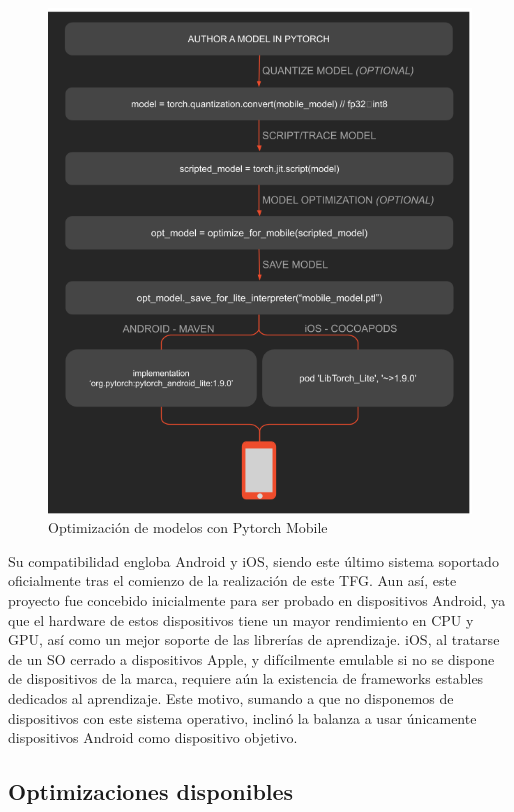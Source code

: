 \begin{figure}[H]
	\centering
	\includegraphics[scale = 0.6]{imagenes/pytorch-mobile.png}
	\caption{Optimización de modelos con Pytorch Mobile \cite{pmobile}}
	\label {fig:mobileprocess}
\end{figure}

Su compatibilidad engloba Android y iOS, siendo este último sistema soportado oficialmente tras el comienzo de la realización de este TFG. Aun así, este proyecto fue concebido inicialmente para ser probado en dispositivos Android, ya que el hardware de estos dispositivos tiene un mayor rendimiento en CPU y GPU, así como un mejor soporte de las librerías de aprendizaje. iOS, al tratarse de un SO cerrado a dispositivos Apple, y difícilmente emulable si no se dispone de dispositivos de la marca, requiere aún la existencia de frameworks estables dedicados al aprendizaje. Este motivo, sumando a que no disponemos de dispositivos con este sistema operativo, inclinó la balanza a usar únicamente dispositivos Android como dispositivo objetivo.

\subsection{Optimizaciones disponibles}


